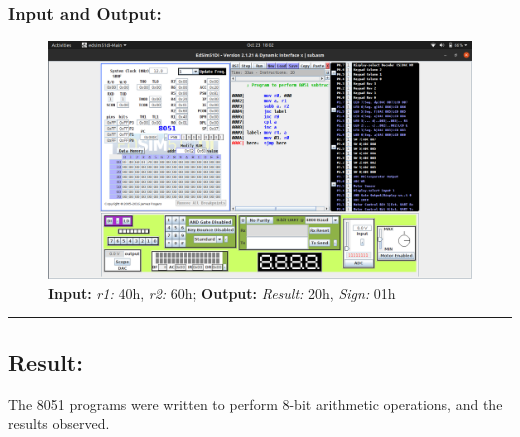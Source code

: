 \documentclass[12pt,a4paper]{article}
\begin{document}
\begin{flushleft}
\subsubsection*{\textbf{Input and Output:}}
\begin{figure}[h]
    \centering
    \includegraphics[trim = 60mm 75mm 60mm 10mm, clip, width = \textwidth]{Pics/Sub.png}
    \caption{ \textbf{Input:} \emph{r1:} 40h, \emph{r2:} 60h; 
              \textbf{Output:} \emph{Result:} 20h, \emph{Sign:} 01h}
\end{figure}
\hrule
\subsection*{\textbf{Result:}}
The 8051 programs were written to perform 8-bit arithmetic operations, and the results observed.
\end{flushleft}
\end{document}
